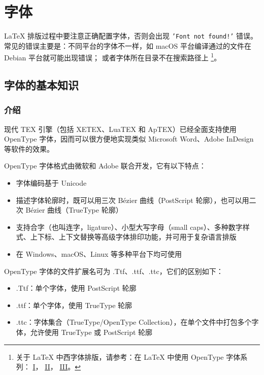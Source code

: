 \chapter{字体}

\newcommand{\sampletext}{世界自由、正义与和平的基础}

{\LaTeX} 排版过程中要注意正确配置字体，否则会出现 \texttt{'Font not found!'} 错误。
常见的错误主要是：不同平台的字体不一样，如 macOS 平台编译通过的文件在 Debian 平台就可能出现错误；
或者字体所在目录不在搜索路径上
\footnote{
关于 {\LaTeX} 中西字体排版，请参考：在 {\LaTeX} 中使用 OpenType 字体系列：
\href{https://stone-zeng.github.io/2018-08-08-use-opentype-fonts}{I}，
\href{https://stone-zeng.github.io/2019-07-06-use-opentype-fonts-ii}{II}，
\href{https://stone-zeng.github.io/2020-05-02-use-opentype-fonts-iii/}{III}。
}。

\section{字体的基本知识}

\subsection{介绍}
现代 TEX 引擎（包括 X⁠E⁠TEX、Lua­TEX 和 Ap­TEX）已经全面支持使用 OpenType 字体，因而可以很方便地实现类似 Microsoft Word、Adobe InDesign 等软件的效果。

OpenType 字体格式由微软和 Adobe 联合开发，它有以下特点：

\begin{itemize}
  \item 字体编码基于 Unicode
  \item 描述字体轮廓时，既可以用三次 Bézier 曲线（PostScript 轮廓），也可以用二次 Bézier 曲线（TrueType 轮廓）
  \item 支持合字（也叫连字，ligature）、小型大写字母（small caps）、多种数字样式、上下标、上下文替换等高级字体排印功能，并可用于复杂语言排版
  \item 在 Windows、macOS、Linux 等多种平台下均可使用
\end{itemize}

OpenType 字体的文件扩展名可为 .Ttf、.ttf、.ttc，它们的区别如下：

\begin{itemize}
  \item .Ttf：单个字体，使用 PostScript 轮廓
  \item .ttf：单个字体，使用 TrueType 轮廓
  \item .ttc：字体集合（TrueType/OpenType Collection），在单个文件中打包多个字体，允许使用 TrueType 或 PostScript 轮廓
\end{itemize}

